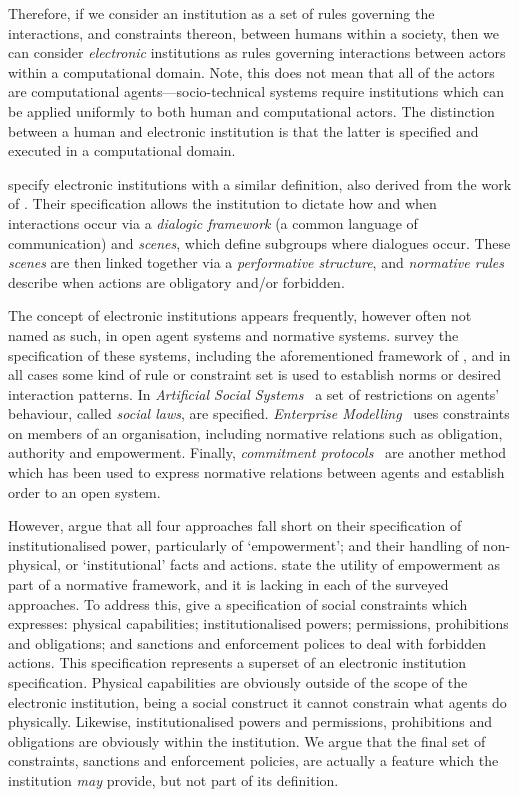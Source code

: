 Therefore, if we consider an institution as a set of rules governing the
interactions, and constraints thereon, between humans within a society, then
we can consider \emph{electronic} institutions as rules governing interactions
between actors within a computational domain. Note, this does not mean that all
of the actors are computational agents---socio-technical systems require
institutions which can be applied uniformly to both human and computational
actors. The distinction between a human and electronic institution is that the
latter is specified and executed in a computational domain.

\citet{Esteva2001} specify electronic institutions with a similar definition,
also derived from the work of \citet{North1990}. Their specification allows
the institution to dictate how and when interactions occur via a
\emph{dialogic framework} (a common language of communication) and
\emph{scenes}, which define subgroups where dialogues occur. These
\emph{scenes} are then linked together via a \emph{performative structure},
and \emph{normative rules} describe when actions are obligatory and/or
forbidden.

The concept of electronic institutions appears frequently, however often not
named as such, in open agent systems and normative systems.
\citet{Artikis2009a} survey the specification of these systems, including the
aforementioned framework of \citet{Esteva2001}, and in all cases some kind of
rule or constraint set is used to establish norms or desired interaction
patterns. In \emph{Artificial Social Systems}~\citep{Moses1995} a set of
restrictions on agents' behaviour, called \emph{social laws}, are specified.
\emph{Enterprise Modelling}~\citep{Fox1995} uses constraints on members of an
organisation, including normative relations such as obligation, authority and
empowerment. Finally, \emph{commitment protocols}~\citep{Chopra2006} are another method which has
been used to express normative relations between agents and establish order to
an open system.

However, \citet{Artikis2009a} argue that all four approaches fall short on their
specification of institutionalised power, particularly of `empowerment'; and their
handling of non-physical, or `institutional' facts and actions. \citet{Jones1996}
state the utility of empowerment as part of a normative framework, and it is
lacking in each of the surveyed approaches. To address this, \citet{Artikis2009}
give a specification of social constraints which expresses: physical
capabilities; institutionalised powers; permissions, prohibitions and
obligations; and sanctions and enforcement polices to deal with forbidden
actions. This specification represents a superset of an electronic institution
specification. Physical capabilities are obviously outside of the scope of the
electronic institution, being a social construct it cannot constrain what agents
do physically. Likewise, institutionalised powers and permissions, prohibitions
and obligations are obviously within the institution. We argue that the final
set of constraints, sanctions and enforcement policies, are actually a feature
which the institution \emph{may} provide, but not part of its definition.

